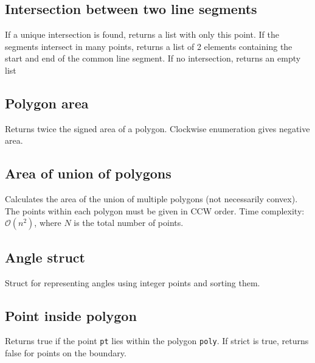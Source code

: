 \documentclass{article}
\begin{document}
\subsection*{Intersection between two line segments}
If a unique intersection is found, returns a list with only this point.
If the segments intersect in many points, returns a list of 2 elements containing the
start and end of the common line segment. If no intersection, returns an empty list

\begin{multicols}{2}
  
  \columnbreak
  
\end{multicols}

\subsection*{Polygon area}
Returns twice the signed area of a polygon. Clockwise enumeration gives negative area.
\begin{multicols}{2}
  
  \columnbreak
  
\end{multicols}

\subsection*{Area of union of polygons}
Calculates the area of the union of multiple polygons (not necessarily convex).
The points within each polygon must be given in CCW order.
Time complexity: $\mathcal{O}(n^2)$, where $N$ is the total number of points.


\subsection*{Angle struct}
Struct for representing angles using integer points and sorting them.


\pagebreak

\subsection*{Point inside polygon}
Returns true if the point \lstinline{pt} lies within the polygon \lstinline{poly}.
If strict is true, returns false for points on the boundary.


\end{document}
